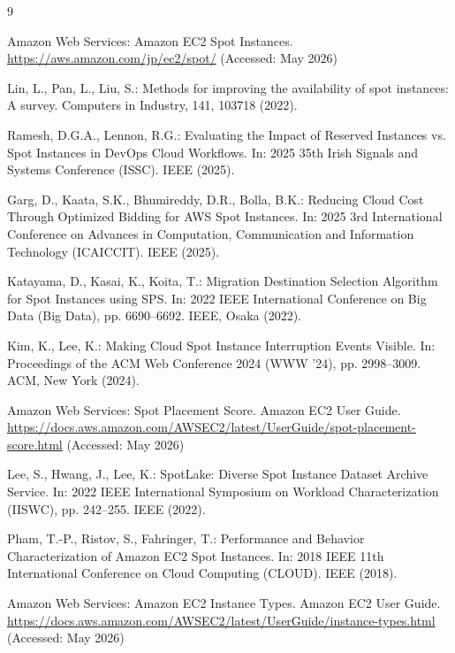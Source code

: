 \documentclass[runningheads]{llncs}
\begin{document}
%
%
\begin{thebibliography}{9}
\raggedright

Amazon Web Services:
Amazon EC2 Spot Instances.
\url{https://aws.amazon.com/jp/ec2/spot/}
(Accessed: May 2026)

Lin, L., Pan, L., Liu, S.:
Methods for improving the availability of spot instances: A survey.
Computers in Industry, 141, 103718 (2022).

Ramesh, D.G.A., Lennon, R.G.:
Evaluating the Impact of Reserved Instances vs. Spot Instances in DevOps Cloud Workflows.
In: 2025 35th Irish Signals and Systems Conference (ISSC).
IEEE (2025).

Garg, D., Kaata, S.K., Bhumireddy, D.R., Bolla, B.K.:
Reducing Cloud Cost Through Optimized Bidding for AWS Spot Instances.
In: 2025 3rd International Conference on Advances in Computation, Communication and Information Technology (ICAICCIT).
IEEE (2025). 

Katayama, D., Kasai, K., Koita, T.:
Migration Destination Selection Algorithm for Spot Instances using SPS.
In: 2022 IEEE International Conference on Big Data (Big Data),
pp. 6690--6692. IEEE, Osaka (2022).

Kim, K., Lee, K.:
Making Cloud Spot Instance Interruption Events Visible.
In: Proceedings of the ACM Web Conference 2024 (WWW '24),
pp. 2998--3009. ACM, New York (2024).

Amazon Web Services:
Spot Placement Score.
Amazon EC2 User Guide.
\url{https://docs.aws.amazon.com/AWSEC2/latest/UserGuide/spot-placement-score.html}
(Accessed: May 2026)

Lee, S., Hwang, J., Lee, K.:
SpotLake: Diverse Spot Instance Dataset Archive Service.
In: 2022 IEEE International Symposium on Workload Characterization (IISWC),
pp. 242--255. IEEE (2022).

Pham, T.-P., Ristov, S., Fahringer, T.:
Performance and Behavior Characterization of Amazon EC2 Spot Instances.
In: 2018 IEEE 11th International Conference on Cloud Computing (CLOUD).
IEEE (2018). 

Amazon Web Services:
Amazon EC2 Instance Types.
Amazon EC2 User Guide.
\url{https://docs.aws.amazon.com/AWSEC2/latest/UserGuide/instance-types.html}
(Accessed: May 2026)

\end{thebibliography}
\end{document}

